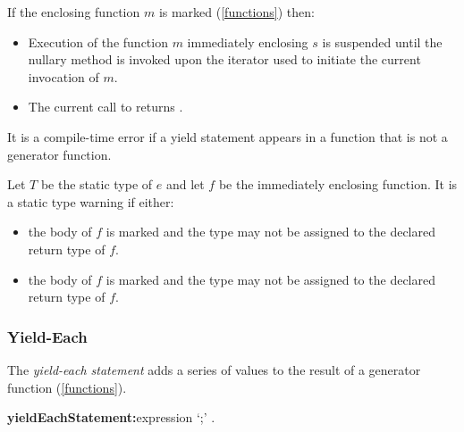 \documentclass{article}
\begin{document}

\LMHash{}
If the enclosing function $m$ is marked \SYNC* (\ref{functions}) then:
\begin{itemize}
\item
Execution of the function $m$ immediately enclosing $s$ is suspended until the nullary method  is invoked upon the iterator used to initiate the current invocation of $m$.
\item
The current call to  returns \TRUE.
\end{itemize}

\LMHash{}
It is a compile-time error if a yield statement appears in a function that is not a generator function.

\LMHash{}
Let $T$ be the static type of $e$ and let $f$ be the immediately enclosing function.
It is a static type warning if either:
\begin{itemize}
\item
the body of $f$ is marked \ASYNC* and the type  may not be assigned to the declared return type of $f$.
\item
the body of $f$ is marked \SYNC* and the type  may not be assigned to the declared return type of $f$.
\end{itemize}


\subsubsection{Yield-Each}

\LMHash{}
The {\em yield-each statement} adds a series of values to the result of a generator function (\ref{functions}).

\begin{grammar}
{\bf yieldEachStatement:}\YIELD* expression `{\escapegrammar ;}'
  .
\end{grammar}
\end{document}

